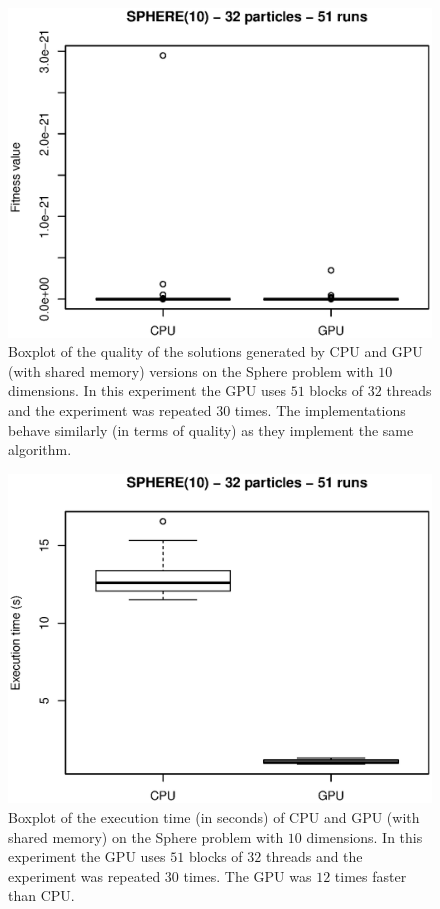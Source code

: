 \documentclass[conference]{IEEEtran}
\begin{document}
    \begin{figure}[!htb]
        \centering
        \includegraphics[width=\columnwidth]{../img/sphere10_32particles_multi_runs_fitness.eps}
        \caption{Boxplot of the quality of the solutions generated by CPU and GPU (with shared memory) versions on the Sphere problem with $10$ dimensions. In this experiment the GPU uses $51$ blocks of $32$ threads and the experiment was repeated $30$ times. The implementations behave similarly (in terms of quality) as they implement the same algorithm.}
        \label{fig:sphere10_32particles_multi_runs_fitness}
    \end{figure}


    \begin{figure}[!htb]
        \centering
        \includegraphics[width=\columnwidth]{../img/sphere10_32particles_multi_runs_time.eps}
        \caption{Boxplot of the execution time (in seconds) of CPU and GPU (with shared memory) on the Sphere problem with $10$ dimensions. In this experiment the GPU uses $51$ blocks of $32$ threads and the experiment was repeated $30$ times. The GPU was $12$ times faster than CPU.}
        \label{fig:sphere10_32particles_multi_runs_time}
    \end{figure}
\end{document}
